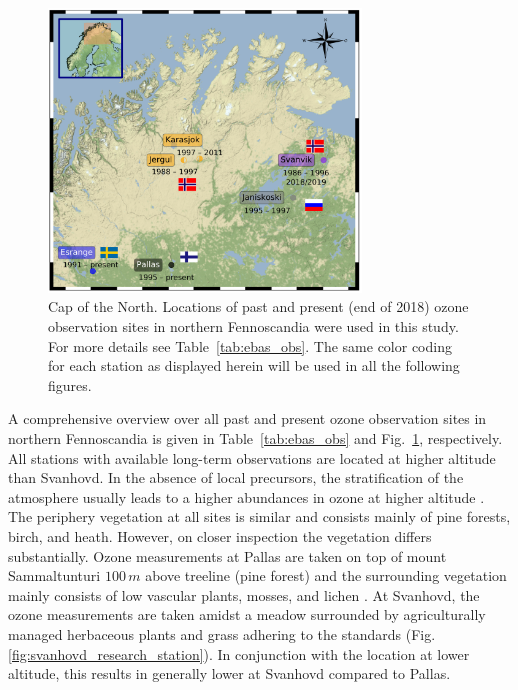 \documentclass[bg, manuscript]{copernicus}
\begin{document}
\begin{figure}[t]
  \includegraphics[width=8.3cm]{fig03}
  \caption{Cap of the North. Locations of past and present (end of 2018) ozone observation sites in northern Fennoscandia were used in this study. For more details see Table~\ref{tab:ebas_obs}. The same color coding for each station as displayed herein will be used in all the following figures.}
  \label{fig:station_map_fennoscandia}
\end{figure}


A comprehensive overview over all past and present ozone observation sites in northern Fennoscandia is given in Table~\ref{tab:ebas_obs} and Fig.~\ref{fig:station_map_fennoscandia}, respectively. All stations with available long-term observations are located at higher altitude than Svanhovd. In the absence of local precursors, the stratification of the atmosphere usually leads to a higher abundances in ozone at higher altitude \citep[e.g.,][]{AB:Klingberg2009}. The periphery vegetation at all sites is similar and consists mainly of pine forests, birch, and heath. However, on closer inspection the vegetation differs substantially. Ozone measurements at Pallas are taken on top of mount Sammaltunturi $100\,\unit{m}$ above treeline (pine forest) and the surrounding vegetation mainly consists of low vascular plants, mosses, and lichen \citep{BER:Hatakka2003}. At Svanhovd, the ozone measurements are taken amidst a meadow surrounded by agriculturally managed herbaceous plants and grass adhering to the \citet{WMOGuide2018} standards (Fig.\ref{fig:svanhovd_research_station}). In conjunction with the location at lower altitude, this results in generally lower \chem{[O_3]} at Svanhovd compared to Pallas.
\end{document}
